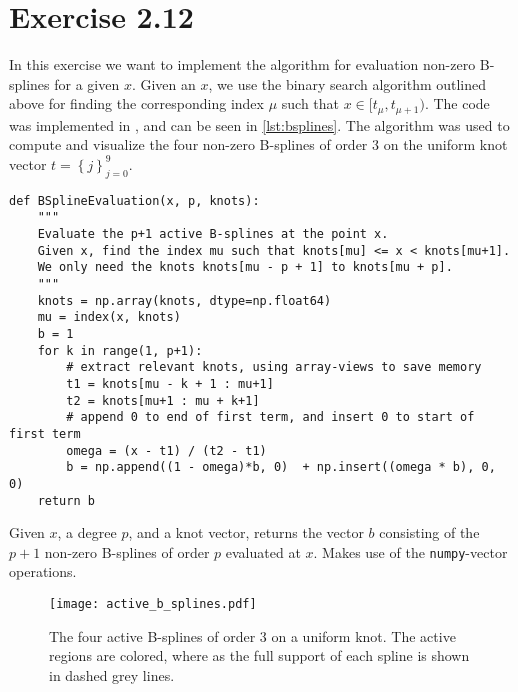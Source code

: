 \documentclass[a4paper]{article}
\begin{document}
    \section*{Exercise 2.12}
    
    In this exercise we want to implement the algorithm for evaluation non-zero
    B-splines for a given $x$. Given an $x$, we use the binary search algorithm
    outlined above for finding the corresponding index $\mu$ such that $x \in
    [t_\mu, t_{\mu+1})$. The code was implemented in , and can
    be seen in \cref{lst:bsplines}. The algorithm was used to compute and
    visualize the four non-zero B-splines of order $3$ on the uniform knot
    vector $t = \left\{j\right\}_{j=0}^9$.
    \begin{listing}
        \begin{verbatim} 
def BSplineEvaluation(x, p, knots):
    """
    Evaluate the p+1 active B-splines at the point x.
    Given x, find the index mu such that knots[mu] <= x < knots[mu+1].
    We only need the knots knots[mu - p + 1] to knots[mu + p].
    """ 
    knots = np.array(knots, dtype=np.float64)
    mu = index(x, knots)
    b = 1
    for k in range(1, p+1):
        # extract relevant knots, using array-views to save memory
        t1 = knots[mu - k + 1 : mu+1]
        t2 = knots[mu+1 : mu + k+1]
        # append 0 to end of first term, and insert 0 to start of first term
        omega = (x - t1) / (t2 - t1)
        b = np.append((1 - omega)*b, 0)  + np.insert((omega * b), 0, 0)
    return b
        \end{verbatim}
        \caption{Given $x$, a degree $p$, and a knot vector, returns the vector
        $b$ consisting of the $p+1$ non-zero B-splines of order $p$ evaluated
    at $x$. Makes use of the \texttt{numpy}-vector operations.}
    \label{lst:bsplines}
    \end{listing}
    \begin{figure}[htpb]
        \centering
        \texttt{[image: active\_b\_splines.pdf]}
        \caption{The four active B-splines of order 3 on a uniform knot. The
        active regions are colored, where as the full support of each spline is
    shown in dashed grey lines.}
        \label{fig:active_b_splines.}
    \end{figure}
\end{document}

